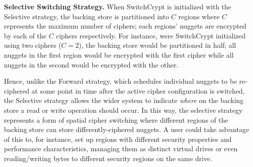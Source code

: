 
\textbf{Selective Switching Strategy.} When SwitchCrypt is initialized with the
Selective strategy, the backing store is partitioned into $C$ regions where $C$
represents the maximum number of ciphers; each regions' nuggets are encrypted by
each of the $C$ ciphers respectively. For instance, were SwitchCrypt initialized
using two ciphers ($C = 2$), the backing store would be partitioned in half; all
nuggets in the first region would be encrypted with the first cipher while all
nuggets in the second would be encrypted with the other.

Hence, unlike the Forward strategy, which schedules individual nuggets to be
re-ciphered at some point in time after the active cipher configuration is
switched, the Selective strategy allows the wider system to indicate
\emph{where} on the backing store a read or write operation should occur. In
this way, the selective strategy represents a form of spatial cipher switching
where different regions of the backing store can store differently-ciphered
nuggets. A user could take advantage of this to, for instance, set up regions
with different security properties and performance characteristics, managing
them as distinct virtual drives or even reading/writing bytes to different
security regions on the same drive.

